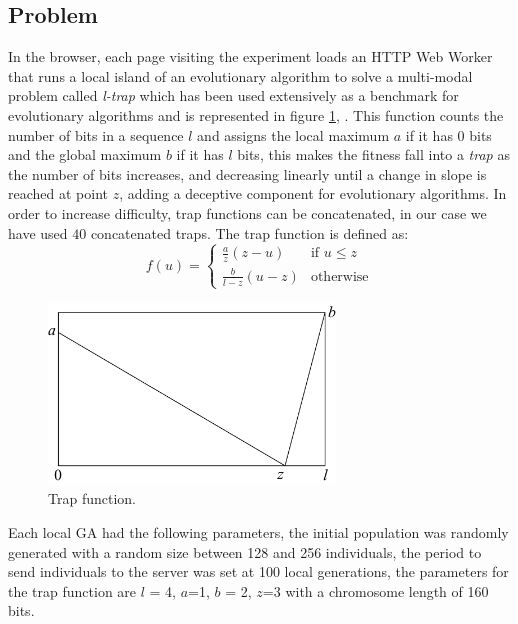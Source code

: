 \documentclass{llncs}
\begin{document}
\subsection{Problem}
In the browser, each page visiting the experiment loads an HTTP Web Worker
that runs a local island of an evolutionary algorithm to solve a
multi-modal problem called {\em l-trap} which has been used extensively
as a benchmark for evolutionary algorithms and is represented in figure \ref{fig:trap},  \cite{fernandes2009using,nijssen2003analysis}.
This function counts the number of bits in a sequence $l$ and assigns
the local maximum $a$ if it has 0 bits and the global maximum $b$ if it has $l$
bits, this makes the fitness fall into a {\em trap}
as the number of bits increases, and decreasing linearly until a change in slope
is reached at point $z$, adding a deceptive component for evolutionary algorithms. In order to increase difficulty, trap functions can be concatenated, in our case we have used $40$ concatenated traps. The trap function is defined as:
\[ f(u)=
    \begin{cases}
      \frac{a}{z}(z-u) & \text{if } u\leq z\\
      \frac{b}{l-z} (u-z)& \text{otherwise}
   \end{cases}
 \]
\begin{figure}[htb]
    \centering
        \includegraphics[width=3in]{img/trap.png}
    \caption{Trap function.
    }
    \label{fig:trap}
\end{figure}


Each local GA had the following parameters, the initial population was randomly generated
with a random size between 128 and 256 individuals, the period to send individuals to the server
was set at 100 local generations, the parameters for the trap function are $l$ = 4,
$a$=1, $b$ = 2, $z$=3 with a chromosome length of 160 bits.
\end{document}
